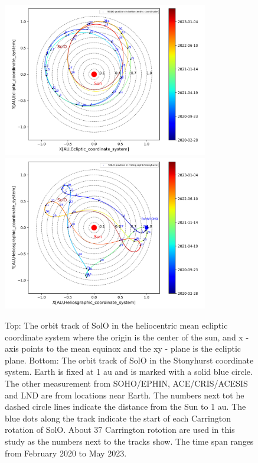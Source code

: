 \begin{figure}
    \centering
    \includegraphics[width=0.8\textwidth]{images/ACR/SOLO_orbit_track_helioscentric_3.png}
    \includegraphics[width = 0.8\textwidth]{images/ACR/SOLO_orbit_stonyhurst_3.png}
    \caption[Orbit track of \ac{SolO}]{Top: The orbit track of \ac{SolO} in the heliocentric mean ecliptic coordinate system where the origin is the center of the sun, and x - axis points to the mean equinox and the xy - plane is the ecliptic plane. Bottom: The orbit track of \ac{SolO} in the Stonyhurst coordinate system. Earth is fixed at 1 au and is marked with a solid blue circle. The other measurement from \acs{SOHO}/\acs{EPHIN}, \acs{ACE}/\acs{CRIS}/\acs{ACESIS} and \acs{LND} are from locations near Earth. The numbers next tot he dashed circle lines indicate the distance from the Sun to 1 au.
    The blue dots along the track indicate the start of each Carrington rotation of \ac{SolO}. About 37 Carrington rototion are used in this study as the numbers next to the tracks show. The time span ranges from February 2020 to May 2023.}
    \label{fig:SOLO_orbit_track}
\end{figure}





